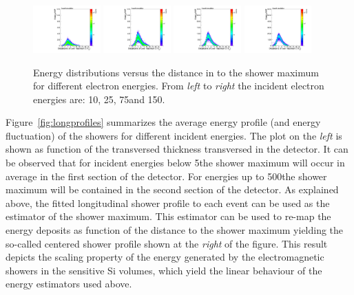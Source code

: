 \begin{figure}[h!]
  \begin{center}
   \includegraphics[width=0.23\textwidth]{figures/version_3e_10_showerprof}
    \includegraphics[width=0.23\textwidth]{figures/version_3e_25_showerprof}
    \includegraphics[width=0.23\textwidth]{figures/version_3e_75_showerprof}
    \includegraphics[width=0.23\textwidth]{figures/version_3e_150_showerprof}
    \caption{ Energy distributions versus the distance in \Xnot to the
      shower maximum for different electron energies. From {\em left}
      to {\em right} the incident electron energies are: 10\GeV,
      25\GeV, 75\GeV and 150\GeV.
   }
    \label{fig:longenergydep}
  \end{center}
\end{figure}

Figure~\ref{fig:longprofiles} summarizes the average energy profile
(and energy fluctuation) of the showers for different incident
energies.
The plot on the {\em left} is shown as function of the transversed
thickness transversed in the detector.
It can be observed that for incident energies below 5\GeV the shower
maximum will occur in average in the first section of the detector.
For energies up to 500\GeV the shower maximum will be contained in the
second section of the detector.
As explained above, the fitted longitudinal shower profile to each
event can be used as the estimator of the shower maximum. This
estimator can be used to re-map the energy deposits as function of the
distance to the shower maximum yielding the so-called centered shower
profile shown at the {\em right} of the figure.
This result depicts the scaling property of the energy generated by
the electromagnetic showers in the sensitive Si volumes,
which yield the linear behaviour of the energy estimators used above.

